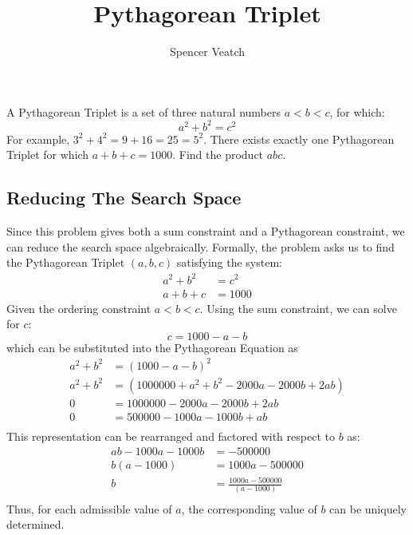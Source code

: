 \documentclass{article}
\title{Pythagorean Triplet}
\author{Spencer Veatch}
\theoremstyle{mytheoremstyle}
\theoremstyle{mytheoremstyle}
\theoremstyle{myproblemstyle}
\begin{document}
    \maketitle
    \begin{problem}

       A Pythagorean Triplet is a set of three natural numbers \( a < b < c  \), for which: \[
        a^2 + b^2 = c^2
       \] 
       For example, \( 3^2 + 4^2 = 9 + 16 = 25 = 5^2 \). There exists exactly one Pythagorean Triplet for which \( a + b
       + c = 1000 \). Find the product \( abc \).
    \end{problem}
    \subsection{Reducing The Search Space}\label{sub:Reducing The Search Space} %
    
    Since this problem gives both a sum constraint and a Pythagorean constraint, we can reduce the search space
    algebraically. Formally, the problem asks us to find the Pythagorean Triplet \( (a,b,c) \) satisfying the system: 
    \[
        \begin{align}
            a^2 + b^2 &= c^2 \\ 
            a + b + c &= 1000 
        \end{align}
    \] 
    Given the ordering constraint \( a < b < c \). Using the sum constraint, we can solve for \( c \): \[
        c = 1000 - a - b
    \]
    which can be substituted into the Pythagorean Equation as \[
        \begin{align*}
            a^2 + b^2 &= (1000 - a -b)^2 \\
            a^2 + b^2 &= (1000000 + a^2 + b^2 -2000a - 2000b + 2ab) \\
            0 &= 1000000 - 2000a - 2000b + 2ab \\
            0 &= 500000 - 1000a - 1000b + ab \\
        \end{align*}
    \] 
    This representation can be rearranged and factored with respect to \( b \) as: 
    \[
        \begin{align}
            ab - 1000a - 1000b &= -500000 \\
            b(a - 1000) &= 1000a - 500000 \\
            b&=  \frac{1000a - 500000}{(a - 1000)} \\
        \end{align}
    \] 
    Thus, for each admissible value of \( a \), the corresponding value of \( b \) can be uniquely determined.
\end{document}
